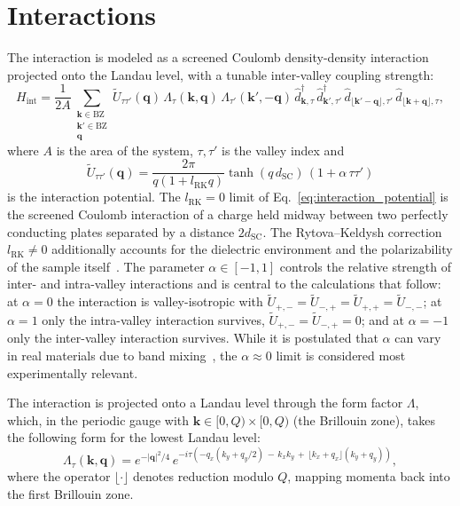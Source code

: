 \section{Interactions}\label{sec:interactions}
The interaction is modeled as a screened Coulomb density-density interaction projected onto the Landau level, with a tunable inter-valley coupling strength:
\begin{equation}
    H_{\text{int}} = \frac{1}{2A} \sum_{\substack{\mathbf{k} \in \text{BZ} \\ \mathbf{k}' \in \text{BZ} \\ \mathbf{q}}} \tilde{U}_{\tau \tau'}(\mathbf{q}) \, \Lambda_\tau(\mathbf{k}, \mathbf{q}) \, \Lambda_{\tau'}(\mathbf{k}', -\mathbf{q}) \, \hat{d}^\dagger_{\mathbf{k}, \tau} \, \hat{d}^\dagger_{\mathbf{k}', \tau'} \, \hat{d}_{\lfloor \mathbf{k}' - \mathbf{q} \rfloor, \tau'} \, \hat{d}_{\lfloor \mathbf{k} + \mathbf{q} \rfloor, \tau},
    \label{eq:interaction}
\end{equation}
where $A$ is the area of the system, $\tau, \tau'$ is the valley index and
\begin{equation}
    \tilde{U}_{\tau \tau'}(\mathbf{q}) = \frac{2\pi}{q (1 + l_{\text{RK}} q)} \tanh(q \, d_{\text{SC}}) \, (1 + \alpha \, \tau \tau')
    \label{eq:interaction_potential}
\end{equation}
is the interaction potential. The $l_{\text{RK}} = 0$ limit of Eq.~\eqref{eq:interaction_potential} is the screened Coulomb interaction of a charge held midway between two perfectly conducting plates separated by a distance $2d_{\text{SC}}$. The Rytova--Keldysh correction $l_{\text{RK}} \neq 0$ additionally accounts for the dielectric environment and the polarizability of the sample itself~\cite{rytova2018screened, keldysh2024coulomb, cudazzo2011dielectric}. The parameter $\alpha \in [-1, 1]$ controls the relative strength of inter- and intra-valley interactions and is central to the calculations that follow: at $\alpha = 0$ the interaction is valley-isotropic with $\tilde{U}_{+, -} = \tilde{U}_{-, +} = \tilde{U}_{+, +} = \tilde{U}_{-, -}$; at $\alpha = 1$ only the intra-valley interaction survives, $\tilde{U}_{+, -} = \tilde{U}_{-, +} = 0$; and at $\alpha = -1$ only the inter-valley interaction survives. While it is postulated that $\alpha$ can vary in real materials due to band mixing~\cite{abouelkomsan2025non}, the $\alpha\approx 0$ limit is considered most experimentally relevant. %

The interaction is projected onto a Landau level through the form factor $\Lambda$, which, in the periodic gauge with $\mathbf{k} \in [0, Q) \times [0, Q)$ (the Brillouin zone), takes the following form for the lowest Landau level:
\begin{equation}
    \Lambda_\tau(\mathbf{k}, \mathbf{q}) = e^{-|\mathbf{q}|^2/4} \, e^{-i \tau \left( -q_x (k_y + q_y/2) \, - \, k_x k_y \, + \, \lfloor k_x + q_x \rfloor (k_y + q_y) \right)},
    \label{eq:form_factor_lll}
\end{equation}
where the operator $\lfloor \cdot \rfloor$ denotes reduction modulo $Q$, mapping momenta back into the first Brillouin zone.

